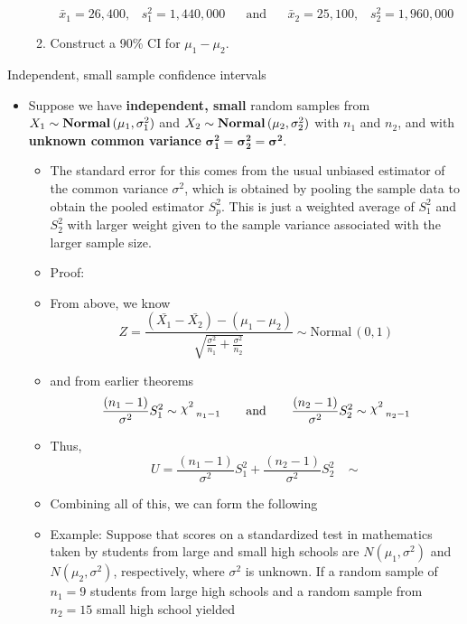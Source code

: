\documentclass{article}
\newcommand{\follow}[1]{\sim \text{#1}\,}		%
\newcommand{\chisq}{\raisebox{2pt}{$\chi^2$}}		%
\begin{document}
\begin{itemize}
\begin{enumerate}
        \[\bar{x}_1 = 26,400, \hspace{10pt} s^2_1 = 1,440,000 \hspace{20pt} \text{and} \hspace{20pt} \bar{x}_2 = 25,100, \hspace{10pt} s^2_2 = 1,960,000\]
        \item[] Construct a 90\% CI for $\mu_1 - \mu_2$.\vspace{80pt}
    \end{enumerate}
\end{itemize}\bigskip

Independent, small sample confidence intervals\bigskip
\begin{itemize}
    \item Suppose we have \textbf{independent, small} random samples from $X_1 \follow{\textbf{Normal}}(\mu_1, \sigma^2_1)$ and $X_2 \follow{\textbf{Normal}}(\mu_2, \sigma^2_2)$ with $n_1$ and $n_2$, and with \textbf{unknown common variance} $\boldsymbol{\sigma^2_1 = \sigma^2_2  = \sigma^2}$.\vspace{150pt}
    \begin{itemize}
        \item The standard error for this comes from the usual unbiased estimator of the common variance $\sigma^2$, which is obtained by pooling the sample data to obtain the pooled estimator $S^2_p$. This is just a weighted average of $S^2_1$ and $S^2_2$ with larger weight given to the sample variance associated with the larger sample size. 
        \item Proof:
        \item[] From above, we know 
        \[Z = \frac{(\bar{X_1} - \bar{X_2}) - (\mu_1 - \mu_2)}{\sqrt{\frac{\sigma^2}{n_1} + \frac{\sigma^2}{n_2}}} \follow{Normal}(0, 1)\]
        \item[] and from earlier theorems
        \[\frac{(n_1 -1)}{\sigma^2} S^2_1 \follow{\chisq}_{n_1 - 1} \hspace{20pt} \text{and} \hspace{20pt} \frac{(n_2 - 1)}{\sigma^2} S^2_2 \follow{\chisq}_{n_2 - 1}\]
        \item[] Thus,
        \[U = \frac{(n_1 -1)}{\sigma^2} S^2_1 + \frac{(n_2 - 1)}{\sigma^2} S^2_2 \hspace{10pt}\sim\]
        \item[] Combining all of this, we can form the following\vspace{150pt}
        \item Example: Suppose that scores on a standardized test in mathematics taken by students from large and small high schools are $N(\mu_1, \sigma^2)$ and $N(\mu_2, \sigma^2)$, respectively, where $\sigma^2$ is unknown. If a random sample of $n_1 = 9$ students from large high schools and a random sample from $n_2 = 15$ small high school yielded

\end{itemize}
\end{itemize}
\end{document}
